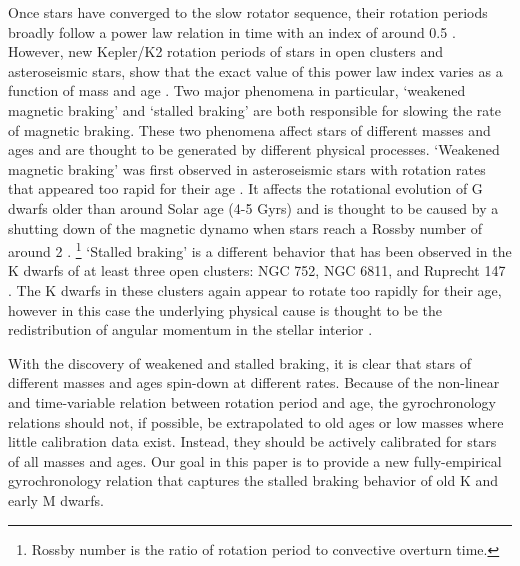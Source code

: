 Once stars have converged to the slow rotator sequence, their rotation periods
broadly follow a power law relation in time with an index of around 0.5
\citep{skumanich1972}.
However, new Kepler/K2 rotation periods of stars in open clusters and
asteroseismic stars, show that the exact value of this power law index varies
as a function of mass and age \citep{angus2015, vansaders2016, curtis2019,
spada2019}.
Two major phenomena in particular, `weakened magnetic braking' and `stalled
braking' are both responsible for slowing the rate of magnetic
braking.
These two phenomena affect stars of different masses and ages and are thought
to be generated by different physical processes.
`Weakened magnetic braking' was first observed in asteroseismic stars with
rotation rates that appeared too rapid for their age
\citep{angus2015}.
It affects the rotational evolution of G dwarfs older
than around Solar age (4-5 Gyrs) and is thought to be caused by a shutting down
of the magnetic dynamo when stars reach a Rossby number of around 2
\citep{vansaders2016, vansaders2018}.
\footnote{Rossby number is the ratio of rotation period to convective overturn
time.}
`Stalled braking' is a different behavior that has been observed in
the K dwarfs of at least three open clusters: NGC 752, NGC 6811, and Ruprecht
147 \citep{agueros2018, curtis2019, curtis2020}.
The K dwarfs in these clusters again appear to rotate too rapidly for their
age, however in this case the underlying physical cause is thought to be the
redistribution of angular momentum in the stellar interior \citep{spada2019}.

With the discovery of weakened and stalled braking, it is clear that stars of
different masses and ages spin-down at different rates.
Because of the non-linear and time-variable relation between rotation period
and age, the gyrochronology relations should not, if possible, be extrapolated
to old ages or low masses where little calibration data exist.
Instead, they should be actively calibrated for stars of all masses and ages.
Our goal in this paper is to provide a new fully-empirical gyrochronology
relation that captures the stalled braking behavior of old K and early M
dwarfs.

